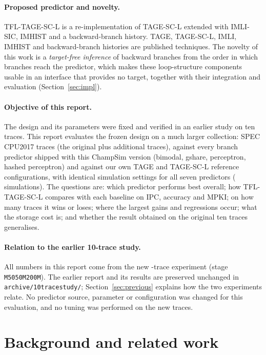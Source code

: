 \documentclass[11pt,a4paper]{article}
\newcommand{\code}[1]{\texttt{#1}}
\newcommand{\prop}{TFL-TAGE-SC-L}
\renewcommand{\_}{\textunderscore\allowbreak}
\begin{document}
\paragraph{Proposed predictor and novelty.} \prop{} is a re-implementation of TAGE-SC-L extended with IMLI-SIC, IMHIST and a backward-branch history. TAGE, TAGE-SC-L, IMLI, IMHIST and backward-branch histories are published techniques. The novelty of this work is a \emph{target-free inference} of backward branches from the order in which branches reach the predictor, which makes these loop-structure components usable in an interface that provides no target, together with their integration and evaluation (Section~\ref{sec:impl}).

\paragraph{Objective of this report.} The design and its parameters were fixed and verified in an earlier study on ten traces. This report evaluates the frozen design on a much larger collection:  SPEC CPU2017 traces (the original  plus  additional traces), against every branch predictor shipped with this ChampSim version (bimodal, gshare, perceptron, hashed perceptron) and against our own TAGE and TAGE-SC-L reference configurations, with identical simulation settings for all seven predictors ( simulations). The questions are: which predictor performs best overall; how \prop{} compares with each baseline on IPC, accuracy and MPKI; on how many traces it wins or loses; where the largest gains and regressions occur; what the storage cost is; and whether the result obtained on the original ten traces generalises.

\paragraph{Relation to the earlier 10-trace study.} All numbers in this report come from the new -trace experiment (stage \code{M50\_50M\_200M}). The earlier report and its results are preserved unchanged in \code{archive/10trace\_study/}; Section~\ref{sec:previous} explains how the two experiments relate. No predictor source, parameter or configuration was changed for this evaluation, and no tuning was performed on the new traces.

\section{Background and related work}
\end{document}
